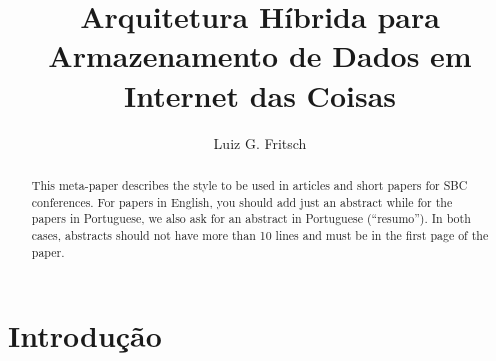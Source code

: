 \documentclass[12pt]{article}
\title{Arquitetura Híbrida para Armazenamento de Dados em Internet das Coisas}
\author{Luiz G. Fritsch\inst{1}}
\begin{document}
 

\maketitle

\begin{abstract}
  This meta-paper describes the style to be used in articles and short papers
  for SBC conferences. For papers in English, you should add just an abstract
  while for the papers in Portuguese, we also ask for an abstract in
  Portuguese (``resumo''). In both cases, abstracts should not have more than
  10 lines and must be in the first page of the paper.
\end{abstract}
     
\begin{resumo} 
  
\end{resumo}


\section{Introdução}
\end{document}

